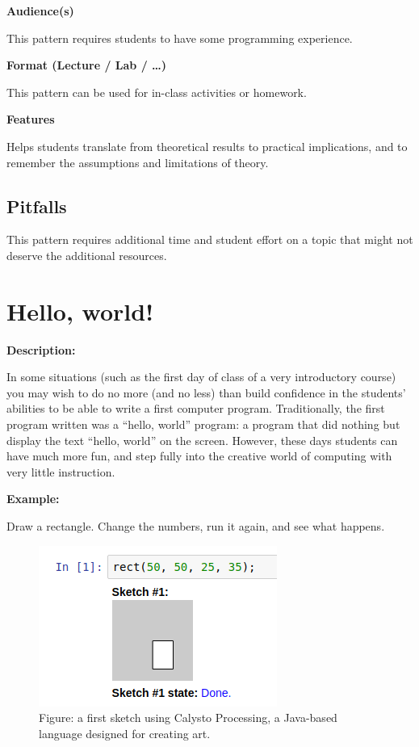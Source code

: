 \documentclass[]{book}
\begin{document}
\textbf{Audience(s)}

This pattern requires students to have some programming experience.

\textbf{Format (Lecture / Lab / \ldots{})}

This pattern can be used for in-class activities or homework.

\textbf{Features}

Helps students translate from theoretical results to practical
implications, and to remember the assumptions and limitations of theory.

\subsection{Pitfalls}\label{pitfalls}

This pattern requires additional time and student effort on a topic that
might not deserve the additional resources.

\section{Hello, world!}\label{hello-world}

\textbf{Description:}

In some situations (such as the first day of class of a very
introductory course) you may wish to do no more (and no less) than build
confidence in the students' abilities to be able to write a first
computer program. Traditionally, the first program written was a
``hello, world'' program: a program that did nothing but display the
text ``hello, world'' on the screen. However, these days students can
have much more fun, and step fully into the creative world of computing
with very little instruction.

\textbf{Example:}

Draw a rectangle. Change the numbers, run it again, and see what
happens.

\begin{figure}
\centering
\includegraphics{images/processing.png}
\caption{Figure: a first sketch using Calysto Processing, a Java-based
language designed for creating art.}
\end{figure}
\end{document}
